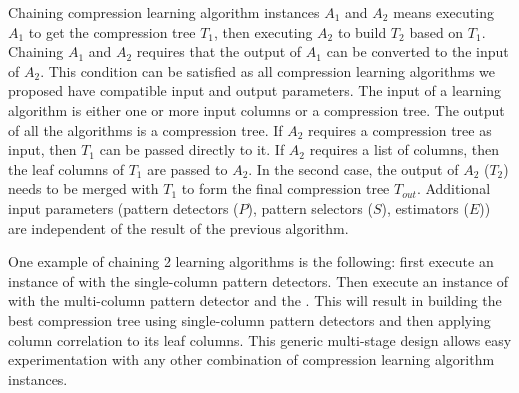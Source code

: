 Chaining compression learning algorithm instances \(A_{1}\) and \(A_{2}\) means executing \(A_{1}\) to get the compression tree \(T_{1}\), then executing \(A_{2}\) to build \(T_{2}\) based on \(T_{1}\). Chaining \(A_{1}\) and \(A_{2}\) requires that the output of \(A_{1}\) can be converted to the input of \(A_{2}\). This condition can be satisfied as all compression learning algorithms we proposed have compatible input and output parameters. The input of a learning algorithm is either one or more input columns or a compression tree. The output of all the algorithms is a compression tree. If \(A_{2}\) requires a compression tree as input, then \(T_{1}\) can be passed directly to it. If \(A_{2}\) requires a list of columns, then the leaf columns of \(T_{1}\) are passed to \(A_{2}\). In the second case, the output of \(A_{2}\) (\(T_{2}\)) needs to be merged with \(T_{1}\) to form the final compression tree \(T_{out}\). Additional input parameters (pattern detectors (\(P\)), pattern selectors (\(S\)), estimators (\(E\))) are independent of the result of the previous algorithm.

One example of chaining 2 learning algorithms is the following: first execute an instance of  with the single-column pattern detectors. Then execute an instance of  with the multi-column pattern detector  and the . This will result in building the best compression tree using single-column pattern detectors and then applying column correlation to its leaf columns. This generic multi-stage design allows easy experimentation with any other combination of compression learning algorithm instances.


